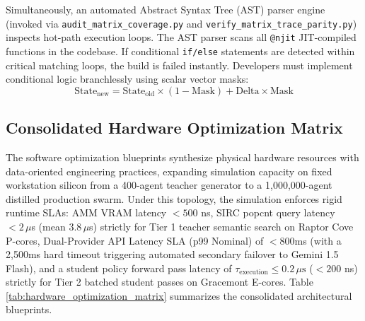 Simultaneously, an automated Abstract Syntax Tree (AST) parser engine (invoked via \texttt{audit\_matrix\_\allowbreak coverage.py} and \texttt{verify\_matrix\_\allowbreak trace\_parity.py}) inspects hot-path execution loops. The AST parser scans all \texttt{@njit} JIT-compiled functions in the codebase. If conditional \texttt{if/else} statements are detected within critical matching loops, the build is failed instantly. Developers must implement conditional logic branchlessly using scalar vector masks:
\begin{equation}
    \text{State}_{\text{new}} = \text{State}_{\text{old}} \times (1 - \text{Mask}) + \text{Delta} \times \text{Mask}
\end{equation}

\subsection{Consolidated Hardware Optimization Matrix}

The software optimization blueprints synthesize physical hardware resources with data-oriented engineering practices, expanding simulation capacity on fixed workstation silicon from a 400-agent teacher generator to a 1,000,000-agent distilled production swarm. Under this topology, the simulation enforces rigid runtime SLAs: AMM VRAM latency $< 500$ ns, SIRC popcnt query latency $< 2\,\mu$s (mean $3.8\,\mu$s) strictly for Tier 1 teacher semantic search on Raptor Cove P-cores, Dual-Provider API Latency SLA (p99 Nominal) of $< 800$ms (with a 2,500ms hard timeout triggering automated secondary failover to Gemini 1.5 Flash), and a student policy forward pass latency of $\tau_{\text{execution}} \le 0.2\,\mu\text{s}$ ($<200$ ns) strictly for Tier 2 batched student passes on Gracemont E-cores. Table \ref{tab:hardware_optimization_matrix} summarizes the consolidated architectural blueprints.

